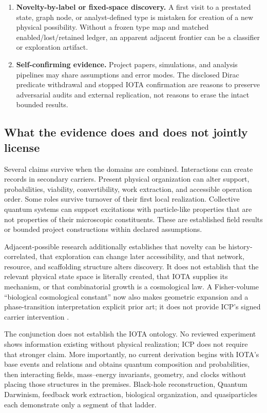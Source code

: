 \begin{enumerate}
  \item \textbf{Novelty-by-label or fixed-space discovery.} A first visit to a
  prestated state, graph node, or analyst-defined type is mistaken for creation
  of a new physical possibility. Without a frozen type map and matched
  enabled/lost/retained ledger, an apparent adjacent frontier can be a
  classifier or exploration artifact.

  \item \textbf{Self-confirming evidence.} Project papers, simulations, and
  analysis pipelines may share assumptions and error modes. The disclosed
  Dirac predicate withdrawal and stopped IOTA confirmation are reasons to
  preserve adversarial audits and external replication, not reasons to erase
  the intact bounded results.
\end{enumerate}

\subsection{What the evidence does and does not jointly license}

Several claims survive when the domains are combined. Interactions can create
records in secondary carriers. Present physical organization can alter support,
probabilities, viability, convertibility, work extraction, and accessible
operation order. Some roles survive turnover of their first local realization.
Collective quantum systems can support excitations with particle-like
properties that are not properties of their microscopic constituents. These
are established field results or bounded project constructions within declared
assumptions.

Adjacent-possible research additionally establishes that novelty can be
history-correlated, that exploration can change later accessibility, and that
network, resource, and scaffolding structure alters discovery. It does not
establish that the relevant physical state space is literally created, that
IOTA supplies its mechanism, or that combinatorial growth is a cosmological
law. A Fisher-volume ``biological cosmological constant'' now also makes
geometric expansion and a phase-transition interpretation explicit prior art;
it does not provide ICP's signed carrier intervention
\citep{FarinaVallejo2026LambdaB}.

The conjunction does not establish the IOTA ontology. No reviewed experiment
shows information existing without physical realization; ICP does not require
that stronger claim. More importantly, no current derivation begins with IOTA's
base events and relations and obtains quantum composition and probabilities,
then interacting fields, mass--energy invariants, geometry, and clocks without
placing those structures in the premises. Black-hole reconstruction, Quantum
Darwinism, feedback work extraction, biological organization, and
quasiparticles each demonstrate only a segment of that ladder.

